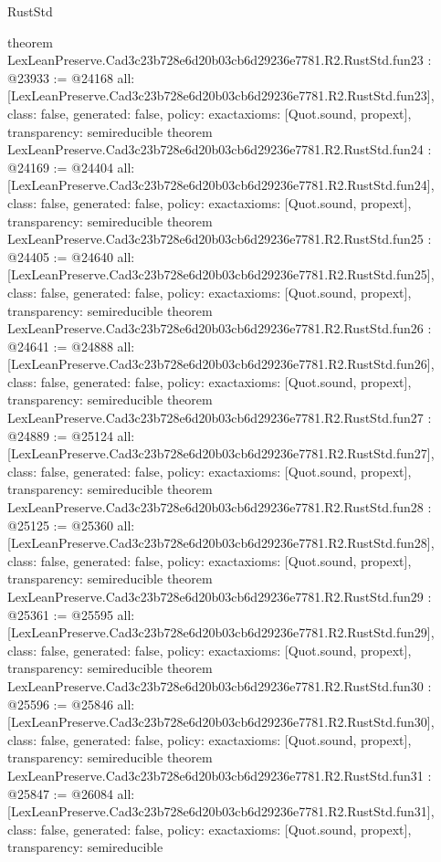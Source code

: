 \begin{lexlean}{RustStd}
\begin{coremodule}
{}
theorem LexLeanPreserve.Cad3c23b728e6d20b03cb6d29236e7781.R2.RustStd.fun23 : @23933 := @24168 {
  all: [LexLeanPreserve.Cad3c23b728e6d20b03cb6d29236e7781.R2.RustStd.fun23],
  class: false,
  generated: false,
  policy: exact{axioms: [Quot.sound, propext]},
  transparency: semireducible
}
theorem LexLeanPreserve.Cad3c23b728e6d20b03cb6d29236e7781.R2.RustStd.fun24 : @24169 := @24404 {
  all: [LexLeanPreserve.Cad3c23b728e6d20b03cb6d29236e7781.R2.RustStd.fun24],
  class: false,
  generated: false,
  policy: exact{axioms: [Quot.sound, propext]},
  transparency: semireducible
}
theorem LexLeanPreserve.Cad3c23b728e6d20b03cb6d29236e7781.R2.RustStd.fun25 : @24405 := @24640 {
  all: [LexLeanPreserve.Cad3c23b728e6d20b03cb6d29236e7781.R2.RustStd.fun25],
  class: false,
  generated: false,
  policy: exact{axioms: [Quot.sound, propext]},
  transparency: semireducible
}
theorem LexLeanPreserve.Cad3c23b728e6d20b03cb6d29236e7781.R2.RustStd.fun26 : @24641 := @24888 {
  all: [LexLeanPreserve.Cad3c23b728e6d20b03cb6d29236e7781.R2.RustStd.fun26],
  class: false,
  generated: false,
  policy: exact{axioms: [Quot.sound, propext]},
  transparency: semireducible
}
theorem LexLeanPreserve.Cad3c23b728e6d20b03cb6d29236e7781.R2.RustStd.fun27 : @24889 := @25124 {
  all: [LexLeanPreserve.Cad3c23b728e6d20b03cb6d29236e7781.R2.RustStd.fun27],
  class: false,
  generated: false,
  policy: exact{axioms: [Quot.sound, propext]},
  transparency: semireducible
}
theorem LexLeanPreserve.Cad3c23b728e6d20b03cb6d29236e7781.R2.RustStd.fun28 : @25125 := @25360 {
  all: [LexLeanPreserve.Cad3c23b728e6d20b03cb6d29236e7781.R2.RustStd.fun28],
  class: false,
  generated: false,
  policy: exact{axioms: [Quot.sound, propext]},
  transparency: semireducible
}
theorem LexLeanPreserve.Cad3c23b728e6d20b03cb6d29236e7781.R2.RustStd.fun29 : @25361 := @25595 {
  all: [LexLeanPreserve.Cad3c23b728e6d20b03cb6d29236e7781.R2.RustStd.fun29],
  class: false,
  generated: false,
  policy: exact{axioms: [Quot.sound, propext]},
  transparency: semireducible
}
theorem LexLeanPreserve.Cad3c23b728e6d20b03cb6d29236e7781.R2.RustStd.fun30 : @25596 := @25846 {
  all: [LexLeanPreserve.Cad3c23b728e6d20b03cb6d29236e7781.R2.RustStd.fun30],
  class: false,
  generated: false,
  policy: exact{axioms: [Quot.sound, propext]},
  transparency: semireducible
}
theorem LexLeanPreserve.Cad3c23b728e6d20b03cb6d29236e7781.R2.RustStd.fun31 : @25847 := @26084 {
  all: [LexLeanPreserve.Cad3c23b728e6d20b03cb6d29236e7781.R2.RustStd.fun31],
  class: false,
  generated: false,
  policy: exact{axioms: [Quot.sound, propext]},
  transparency: semireducible
}
\end{coremodule}
\end{lexlean}
